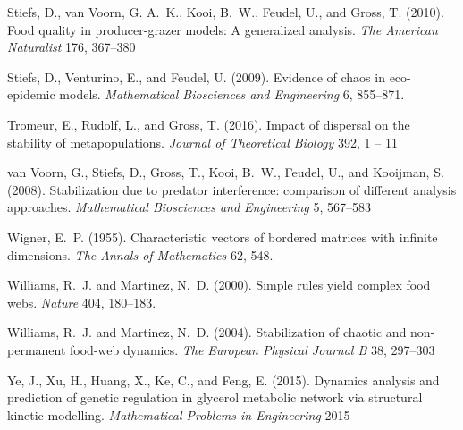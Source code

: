 \documentclass{article}
\begin{document}
\begin{thebibliography}{85}
Stiefs, D., van Voorn, G. A.~K., Kooi, B.~W., Feudel, U., and Gross, T. (2010).
\newblock Food quality in producer-grazer models: A generalized analysis.
\newblock \emph{The American Naturalist} 176, 367--380

Stiefs, D., Venturino, E., and Feudel, U. (2009).
\newblock Evidence of chaos in eco-epidemic models.
\newblock \emph{Mathematical Biosciences and Engineering} 6, 855--871.
\newblock {}

Tromeur, E., Rudolf, L., and Gross, T. (2016).
\newblock Impact of dispersal on the stability of metapopulations.
\newblock \emph{Journal of Theoretical Biology} 392, 1 -- 11

van Voorn, G., Stiefs, D., Gross, T., Kooi, B.~W., Feudel, U., and Kooijman, S.
  (2008).
\newblock Stabilization due to predator interference: comparison of different
  analysis approaches.
\newblock \emph{Mathematical Biosciences and Engineering} 5, 567--583

Wigner, E.~P. (1955).
\newblock Characteristic vectors of bordered matrices with infinite dimensions.
\newblock \emph{The Annals of Mathematics} 62, 548.
\newblock {}

Williams, R.~J. and Martinez, N.~D. (2000).
\newblock Simple rules yield complex food webs.
\newblock \emph{Nature} 404, 180--183.
\newblock {}

Williams, R.~J. and Martinez, N.~D. (2004).
\newblock Stabilization of chaotic and non-permanent food-web dynamics.
\newblock \emph{The European Physical Journal B} 38, 297--303

Ye, J., Xu, H., Huang, X., Ke, C., and Feng, E. (2015).
\newblock Dynamics analysis and prediction of genetic regulation in glycerol
  metabolic network via structural kinetic modelling.
\newblock \emph{Mathematical Problems in Engineering} 2015


\end{thebibliography}
\end{document}
